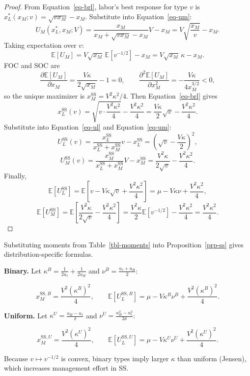 \documentclass[
  english,
  a4paper,
  12pt]{article}
\newcommand{\E}{\mathbb{E}}
\theoremstyle{plain}
\theoremstyle{plain}
\theoremstyle{definition}
\theoremstyle{remark}
\begin{document}
\begin{proof}
From Equation~\ref{eq-brl}, labor's best response for type \(v\) is
\(x_L^*(x_M;v)=\sqrt{vx_M}-x_M\). Substitute into Equation~\ref{eq-um}:
\[
U_M(x_L^*,x_M;V)
=\frac{x_M}{x_M+\sqrt{vx_M}-x_M}V-x_M
=V\sqrt{\frac{x_M}{v}}-x_M.
\] Taking expectation over \(v\): \[
\E[U_M]=V\sqrt{x_M}\,\E[v^{-1/2}]-x_M
=V\sqrt{x_M}\,\kappa-x_M.
\] FOC and SOC are \[
\frac{\partial \E[U_M]}{\partial x_M}
=\frac{V\kappa}{2\sqrt{x_M}}-1=0,
\qquad
\frac{\partial^2 \E[U_M]}{\partial x_M^2}
=-\frac{V\kappa}{4x_M^{3/2}}<0,
\] so the unique maximizer is \(x_M^{\mathrm{SS}}=V^2\kappa^2/4\). Then
Equation~\ref{eq-brl} gives \[
x_L^{\mathrm{SS}}(v)
=\sqrt{v\cdot\frac{V^2\kappa^2}{4}}-\frac{V^2\kappa^2}{4}
=\frac{V\kappa}{2}\sqrt v-\frac{V^2\kappa^2}{4}.
\] Substitute into Equation~\ref{eq-ul} and Equation~\ref{eq-um}: \[
U_L^{\mathrm{SS}}(v)
=\frac{x_L^{\mathrm{SS}}}{x_L^{\mathrm{SS}}+x_M^{\mathrm{SS}}}v-x_L^{\mathrm{SS}}
=\left(\sqrt v-\frac{V\kappa}{2}\right)^2,
\] \[
U_M^{\mathrm{SS}}(v)
=\frac{x_M^{\mathrm{SS}}}{x_L^{\mathrm{SS}}+x_M^{\mathrm{SS}}}V-x_M^{\mathrm{SS}}
=\frac{V^2\kappa}{2\sqrt v}-\frac{V^2\kappa^2}{4}.
\] Finally, \[
\E[U_L^{\mathrm{SS}}]
=\E\!\left[v-V\kappa\sqrt v+\frac{V^2\kappa^2}{4}\right]
=\mu-V\kappa\nu+\frac{V^2\kappa^2}{4},
\] \[
\E[U_M^{\mathrm{SS}}]
=\E\!\left[\frac{V^2\kappa}{2\sqrt v}-\frac{V^2\kappa^2}{4}\right]
=\frac{V^2\kappa}{2}\E[v^{-1/2}]-\frac{V^2\kappa^2}{4}
=\frac{V^2\kappa^2}{4}.
\]
\end{proof}

Substituting moments from Table~\ref{tbl-moments} into
Proposition~\ref{prp-ss} gives distribution-specific formulas.

\textbf{Binary.} Let \(\kappa^B = \frac{1}{2u_\ell} + \frac{1}{2u_H}\)
and \(\nu^B = \frac{u_\ell + u_H}{2}\):

\[
x_M^{\mathrm{SS},B} = \frac{V^2(\kappa^B)^2}{4},
\qquad
\E\!\left[U_L^{\mathrm{SS},B}\right]
  = \mu - V\kappa^B\nu^B + \frac{V^2(\kappa^B)^2}{4}.
\]

\textbf{Uniform.} Let \(\kappa^U = \frac{u_H - u_\ell}{\delta}\) and
\(\nu^U = \frac{u_H^3 - u_\ell^3}{3\delta}\):

\[
x_M^{\mathrm{SS},U} = \frac{V^2(\kappa^U)^2}{4},
\qquad
\E\!\left[U_L^{\mathrm{SS},U}\right]
  = \mu - V\kappa^U\nu^U + \frac{V^2(\kappa^U)^2}{4}.
\]

Because \(v\mapsto v^{-1/2}\) is convex, binary types imply larger
\(\kappa\) than uniform (Jensen), which increases management effort in
SS.
\end{document}
